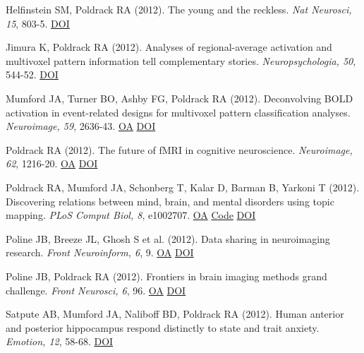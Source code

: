 \documentclass[10pt, letterpaper]{article}
\begin{document}
Helfinstein SM, Poldrack RA (2012). The young and the reckless. \textit{Nat Neurosci, 15}, 803-5. \href{http://dx.doi.org/10.1038/nn.3116}{DOI} \vspace{2mm}

Jimura K, Poldrack RA (2012). Analyses of regional-average activation and multivoxel pattern information tell complementary stories. \textit{Neuropsychologia, 50}, 544-52. \href{http://dx.doi.org/10.1016/j.neuropsychologia.2011.11.007}{DOI} \vspace{2mm}

Mumford JA, Turner BO, Ashby FG, Poldrack RA (2012). Deconvolving BOLD activation in event-related designs for multivoxel pattern classification analyses. \textit{Neuroimage, 59}, 2636-43. \href{https://www.ncbi.nlm.nih.gov/pmc/articles/PMC3251697}{OA} \href{http://dx.doi.org/10.1016/j.neuroimage.2011.08.076}{DOI} \vspace{2mm}

Poldrack RA (2012). The future of fMRI in cognitive neuroscience. \textit{Neuroimage, 62}, 1216-20. \href{https://www.ncbi.nlm.nih.gov/pmc/articles/PMC4131441}{OA} \href{http://dx.doi.org/10.1016/j.neuroimage.2011.08.007}{DOI} \vspace{2mm}

Poldrack RA, Mumford JA, Schonberg T, Kalar D, Barman B, Yarkoni T (2012). Discovering relations between mind, brain, and mental disorders using topic mapping. \textit{PLoS Comput Biol, 8}, e1002707. \href{https://www.ncbi.nlm.nih.gov/pmc/articles/PMC3469446}{OA} \href{https://github.com/poldrack/LatentStructure}{Code} \href{http://dx.doi.org/10.1371/journal.pcbi.1002707}{DOI} \vspace{2mm}

Poline JB, Breeze JL, Ghosh S et al. (2012). Data sharing in neuroimaging research. \textit{Front Neuroinform, 6}, 9. \href{https://www.ncbi.nlm.nih.gov/pmc/articles/PMC3319918}{OA} \href{http://dx.doi.org/10.3389/fninf.2012.00009}{DOI} \vspace{2mm}

Poline JB, Poldrack RA (2012). Frontiers in brain imaging methods grand challenge. \textit{Front Neurosci, 6}, 96. \href{https://www.ncbi.nlm.nih.gov/pmc/articles/PMC3390895}{OA} \href{http://dx.doi.org/10.3389/fnins.2012.00096}{DOI} \vspace{2mm}

Satpute AB, Mumford JA, Naliboff BD, Poldrack RA (2012). Human anterior and posterior hippocampus respond distinctly to state and trait anxiety. \textit{Emotion, 12}, 58-68. \href{http://dx.doi.org/10.1037/a0026517}{DOI} \vspace{2mm}
\end{document}
